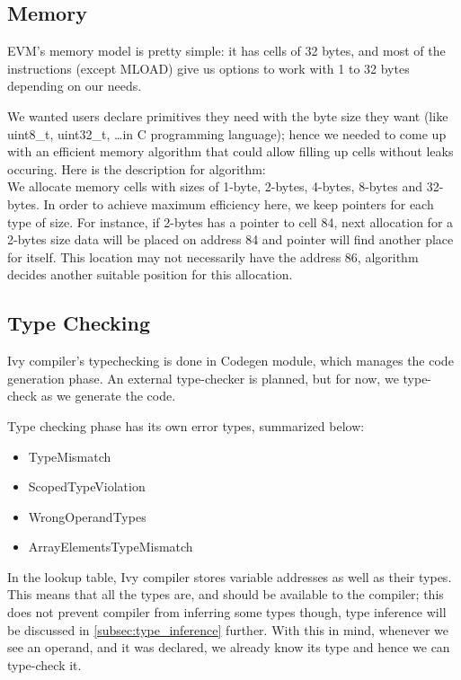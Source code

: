 \documentclass{article}
\begin{document}
\subsection{Memory}
\label{subsec:memory}
\par EVM's memory model is pretty simple: it has cells of 32 bytes, and most of the instructions (except MLOAD) give us options to work with 1 to 32 bytes depending on our needs.
\par We wanted users declare primitives they need with the byte size they want (like uint8\_t, uint32\_t, \ldots in C programming language); hence we needed to come up with an efficient memory algorithm that could allow filling up cells without leaks occuring. Here is the description for algorithm: \\

We allocate memory cells with sizes of 1-byte, 2-bytes, 4-bytes, 8-bytes and 32-bytes. In order to achieve maximum efficiency here, we keep pointers for each type of size. For instance, if 2-bytes has a pointer to cell 84, next allocation for a 2-bytes size data will be placed on address 84 and pointer will find another place for itself. This location may not necessarily have the address 86, algorithm decides another suitable position for this allocation.

\subsection{Type Checking}
\label{subsec:type_checking}
Ivy compiler's typechecking is done in Codegen module, which manages the code generation phase. An external type-checker is planned, but for now, we type-check as we generate the code.

Type checking phase has its own error types, summarized below:
\begin{itemize}
  \item TypeMismatch
  \item ScopedTypeViolation
  \item WrongOperandTypes
  \item ArrayElementsTypeMismatch
\end{itemize}

In the lookup table, Ivy compiler stores variable addresses as well as their types. This means that all the types are, and should be available to the compiler; this does not prevent compiler from inferring some types though, type inference will be discussed in \ref{subsec:type_inference} further. With this in mind, whenever we see an operand, and it was declared, we already know its type and hence we can type-check it.
\end{document}
